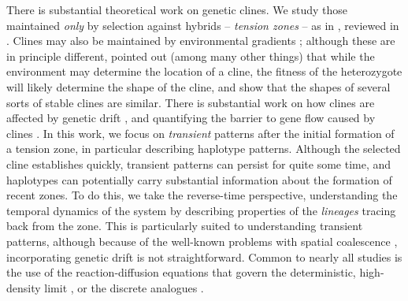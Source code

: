 \documentclass[11pt,letterpaper]{article}
\newcommand{\alisa}[1]{{\em \color{red} #1}}
\begin{document}
There is substantial theoretical work on genetic clines.
We study those maintained \emph{only} by selection against hybrids -- \emph{tension zones} --
as in \citet{Bazykin1969}, reviewed in \citet{Barton1985}.
Clines may also be maintained by environmental gradients \citep{Haldane1948,Fisher1950};
although these are in principle different,
\citet{Slatkin1973} pointed out (among many other things)
that while the environment may determine the location of a cline,
the fitness of the heterozygote will likely determine the shape of the cline,
and \citet{Barton1986} show that the shapes of several sorts of stable clines are similar.
There is substantial work on how clines are affected by genetic drift \citep{Slatkin1975,felsenstein1975genetic,Barton2008,Polechova2011},
and quantifying the barrier to gene flow caused by clines \citep{barton1979gene,barton1989adaptation,Barton1993,Barton2000}.
In this work, we focus on \emph{transient} patterns after the initial formation of a tension zone,
in particular describing haplotype patterns.
Although the selected cline establishes quickly, transient patterns can persist for quite some time,
and haplotypes can potentially carry substantial information about the formation of recent zones.
To do this, we take the reverse-time perspective,
understanding the temporal dynamics of the system by describing properties of the \emph{lineages} tracing back from the zone.
This is particularly suited to understanding transient patterns,
although because of the well-known problems with spatial coalescence \citep{felsenstein1978pain,barton2002spatial},
incorporating genetic drift is not straightforward.
Common to nearly all studies is the use of the
reaction-diffusion equations that govern the deterministic, high-density limit \citep[][as in]{Nagylaki1975},
or the discrete analogues \citep{Hansen1966}.

\end{document}
